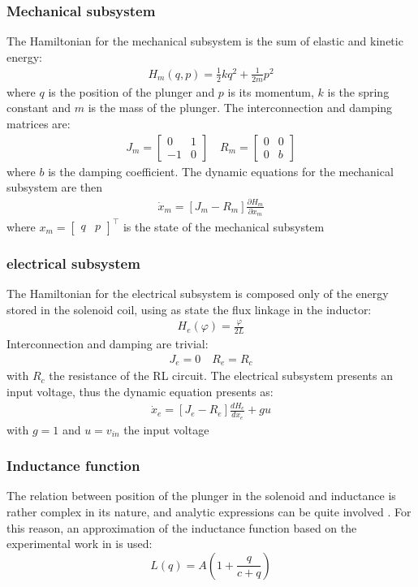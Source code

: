 \documentclass[letterpaper, 10pt, conference]{ieeeconf}
\begin{document}
\subsubsection{Mechanical subsystem}
The Hamiltonian for the mechanical subsystem is the sum of elastic and kinetic energy:
\begin{align}
H_m(q,p) = \frac{1}{2}kq^2 + \frac{1}{2m} p^2  
\end{align}
where $q$ is the position of the plunger and $p$ is its momentum, $k$ is the spring constant and $m$ is the mass of the plunger.
The interconnection and damping matrices are:
\begin{align}
J_m = \begin{bmatrix}
    0 & 1 \\ -1 & 0
\end{bmatrix} \quad R_m = \begin{bmatrix}
    0 & 0 \\ 0 & b
\end{bmatrix}
\end{align}
where $b$ is the damping coefficient.
The dynamic equations for the mechanical subsystem are then
\begin{align}
\dot{x}_m = [J_m-R_m]\frac{\partial H_m}{\partial x_m}
\end{align}\label{original_PCH}
where $x_m = \begin{bmatrix}
    q & p 
\end{bmatrix}^\top $ is the state of the mechanical subsystem

\subsubsection{electrical subsystem}
The Hamiltonian for the electrical subsystem is composed only of the energy stored in the solenoid coil, using as state the flux linkage in the inductor:
\begin{align}
H_e(\varphi) = \frac{\varphi}{2 L}
\end{align}
Interconnection and damping are trivial:
\begin{align}
J_e = 0 \quad R_e = R_c
\end{align}
with $R_c$ the resistance of the RL circuit.
The electrical subsystem presents an input voltage, thus the dynamic equation presents as:
\begin{align}
    \dot{x}_e = [J_e-R_e]\frac{dH_e}{dx_e} + gu
\end{align}
with $g=1$ and $u=v_{in}$ the input voltage
\subsubsection{Inductance function}
The relation between position of the plunger in the solenoid and inductance is rather complex in its nature, and analytic expressions can be quite involved \cite{analytic_solen}. For this reason, an approximation of the inductance function based on the experimental work in \cite{approx_solen} is used:
\begin{equation}
    L(q) = A\left(1 + \frac{q}{c+q}\right)
\end{equation}
\end{document}
